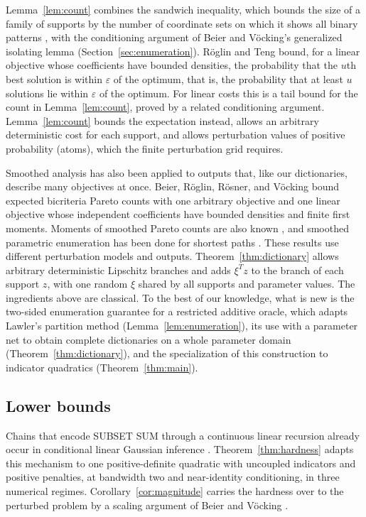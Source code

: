 Lemma~\ref{lem:count} combines the sandwich inequality, which bounds the
size of a family of supports by the number of coordinate sets on which
it shows all binary patterns \cite[Theorem~5]{KozmaMoran}, with the
conditioning argument of Beier and V\"ocking's generalized isolating
lemma \cite[conference version, Lemma~5]{BeierVocking}
(Section~\ref{sec:enumeration}). R\"oglin and Teng
\cite[Lemma~6.1]{RoglinTeng} bound, for a linear objective whose
coefficients have bounded densities, the
probability that the $u$th best solution is within $\varepsilon$ of the
optimum, that is, the probability that at least $u$ solutions lie within
$\varepsilon$ of the optimum. For linear costs this is a tail bound for
the count in Lemma~\ref{lem:count}, proved by a related conditioning
argument. Lemma~\ref{lem:count} bounds the expectation instead, allows
an arbitrary deterministic cost for each support, and allows
perturbation values of positive probability (atoms), which the finite
perturbation grid requires.

Smoothed analysis has also been applied to outputs that, like our
dictionaries, describe many objectives at once. Beier, R\"oglin,
R\"osner, and V\"ocking \cite[Theorem~1]{BeierPareto} bound expected
bicriteria Pareto counts with one arbitrary objective and one linear
objective whose independent coefficients have bounded densities and
finite first moments. Moments of smoothed Pareto counts are also known
\cite{RoglinTeng,BrunschRoglin}, and smoothed parametric enumeration has
been done for shortest paths \cite[Section~6]{ApplegatePaths}. These
results use different perturbation models and outputs.
Theorem~\ref{thm:dictionary} allows arbitrary deterministic Lipschitz
branches and adds $\xi^Tz$ to the branch of each support $z$, with one
random $\xi$ shared by all supports and parameter values. The
ingredients above are classical. To the best of our knowledge, what is
new is the two-sided enumeration guarantee for a restricted additive
oracle, which adapts Lawler's partition method \cite{Lawler}
(Lemma~\ref{lem:enumeration}), its use with a parameter net to
obtain complete dictionaries on a whole parameter domain
(Theorem~\ref{thm:dictionary}), and the specialization of this
construction to indicator quadratics (Theorem~\ref{thm:main}).

\subsection{Lower bounds}
Chains that encode SUBSET SUM through a continuous linear recursion
already occur in conditional linear Gaussian inference
\cite[Section~3]{LernerParr}. Theorem~\ref{thm:hardness} adapts this
mechanism to one positive-definite quadratic with uncoupled indicators
and positive penalties, at bandwidth two and near-identity conditioning,
in three numerical regimes. Corollary~\ref{cor:magnitude} carries the
hardness over to the perturbed problem by a scaling argument of Beier
and V\"ocking \cite[conference version, Theorem~3]{BeierVocking}.

